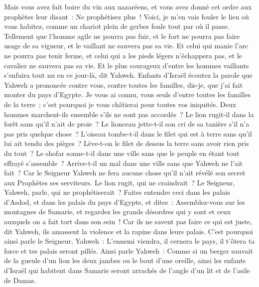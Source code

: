 \begin{multicols}{2}
Mais vous avez fait boire du vin aux nazaréens, et vous avez donné cet ordre aux prophètes leur disant~: Ne prophétisez plus~!
Voici, je m'en vais fouler le lieu où vous habitez, comme un chariot plein de gerbes foule tout par où il passe.
Tellement que l'homme agile ne pourra pas fuir, et le fort ne pourra pas faire usage de sa vigueur, et le vaillant ne sauvera pas sa vie.
Et celui qui manie l'arc ne pourra pas tenir ferme, et celui qui a les pieds légers n'échappera pas, et le cavalier ne sauvera pas sa vie.
Et le plus courageux d'entre les hommes vaillants s'enfuira tout nu en ce jour-là, dit Yahweh.
\VerseOne{}Enfants d'Israël écoutez la parole que Yahweh a prononcée contre vous, contre toutes les familles, dis-je, que j'ai fait monter du pays d'Egypte.
Je vous ai connu, vous seuls d'entre toutes les familles de la terre~; c'est pourquoi je vous châtierai pour toutes vos iniquités.
Deux hommes marchent-ils ensemble s'ils ne sont pas accordés~?
Le lion rugit-il dans la forêt sans qu'il n'ait de proie~? Le lionceau jette-t-il son cri de sa tanière s'il n'a pas pris quelque chose~?
L'oiseau tombe-t-il dans le filet qui est à terre sans qu'il lui ait tendu des pièges~? Lève-t-on le filet de dessus la terre sans avoir rien pris du tout~?
Le shofar sonne-t-il dans une ville sans que le peuple en étant tout effrayé s'assemble~? Arrive-t-il un mal dans une ville sans que Yahweh ne l'ait fait~?
Car le Seigneur Yahweh ne fera aucune chose qu'il n'ait révélé son secret aux Prophètes ses serviteurs. 
Le lion rugit, qui ne craindrait~? Le Seigneur, Yahweh, parle, qui ne prophétiserait~?
Faites entendre ceci dans les palais d'Asdod, et dans les palais du pays d'Egypte, et dites~: Assemblez-vous sur les montagnes de Samarie, et regardez les grands désordres qui y sont et ceux auxquels on a fait tort dans son sein~!
Car ils ne savent pas faire ce qui est juste, dit Yahweh, ils amassent la violence et la rapine dans leurs palais.
C'est pourquoi ainsi parle le Seigneur, Yahweh~: L'ennemi viendra, il cernera le pays, il t'ôtera ta force et tes palais seront pillés.
Ainsi parle Yahweh~: Comme si un berger sauvait de la gueule d'un lion les deux jambes ou le bout d'une oreille, ainsi les enfants d'Israël qui habitent dans Samarie seront arrachés de l'angle d'un lit et de l'asile de Damas.

\end{multicols}
